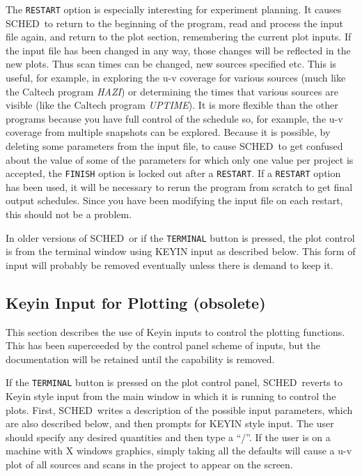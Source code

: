 \documentclass{report}
\newcommand{\schedb}{{\sc SCHED~}}
\begin{document}
The {\tt RESTART} option is especially interesting for experiment
planning.  It causes \schedb to return to the beginning of the
program, read and process the input file again, and return to the plot
section, remembering the current plot inputs.  If the input file has
been changed in any way, those changes will be reflected in the new
plots.  Thus scan times can be changed, new sources specified etc.
This is useful, for example, in exploring the u-v coverage for various
sources (much like the Caltech program {\sl HAZI}) or determining the
times that various sources are visible (like the Caltech program {\sl
UPTIME}).  It is more flexible than the other programs because you
have full control of the schedule so, for example, the u-v coverage
from multiple snapshots can be explored.  Because it is possible, by
deleting some parameters from the input file, to cause \schedb to get
confused about the value of some of the parameters for which only one
value per project is accepted, the {\tt FINISH} option is locked out
after a {\tt RESTART}.  If a {\tt RESTART} option has been used, it
will be necessary to rerun the program from scratch to get final
output schedules.  Since you have been modifying the input file on
each restart, this should not be a problem.

In older versions of \schedb or if the {\tt TERMINAL} button is pressed,
the plot control is from the terminal window using KEYIN input as
described below.  This form of input will probably be removed eventually
unless there is demand to keep it.

\subsection{Keyin Input for Plotting (obsolete)}

This section describes the use of Keyin inputs to control the plotting
functions.  This has been superceeded by the control panel scheme
of inputs, but the documentation will be retained until the capability
is removed.

If the {\tt TERMINAL} button is pressed on the plot control panel,
\schedb reverts to Keyin style input from the main window in which it
is running to control the plots.  First, \schedb writes a description
of the possible input parameters, which are also described below, and
then prompts for KEYIN style input.  The user should specify any
desired quantities and then type a ``/''.  If the user is on a machine
with X windows graphics, simply taking all the defaults will cause a
u-v plot of all sources and scans in the project to appear on the
screen.
\end{document}
